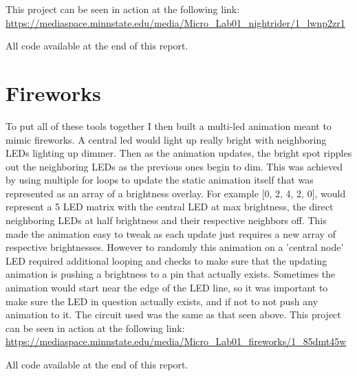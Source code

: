 \documentclass[prb,preprint]{revtex4-1}
\begin{document}
This project can be seen in action at the following link: \url{https://mediaspace.minnstate.edu/media/Micro_Lab01_nightrider/1_lwnp2zr1}

All code available at the end of this report.

\section{Fireworks}
To put all of these tools together I then built a multi-led animation meant to mimic fireworks. A central led would light up really bright with neighboring LEDs lighting up dimmer. Then as the animation updates, the bright spot ripples out the neighboring LEDs as the previous ones begin to dim. This was achieved by using multiple for loops to update the static animation itself that was represented as an array of a brightness overlay. For example [0, 2, 4, 2, 0], would represent a 5 LED matrix with the central LED at max brightness, the direct neighboring LEDs at half brightness and their respective neighbors off. This made the animation easy to tweak as each update just requires a new array of respective brightnesses. However to randomly this animation on a 'central node' LED required additional looping and checks to make sure that the updating animation is pushing a brightness to a pin that actually exists. Sometimes the animation would start near the edge of the LED line, so it was important to make sure the LED in question actually exists, and if not to not push any animation to it. The circuit used was the same as that seen above. This project can be seen in action at the following link: \url{https://mediaspace.minnstate.edu/media/Micro_Lab01_fireworks/1_85dmt45w}

All code available at the end of this report.

\end{document}
